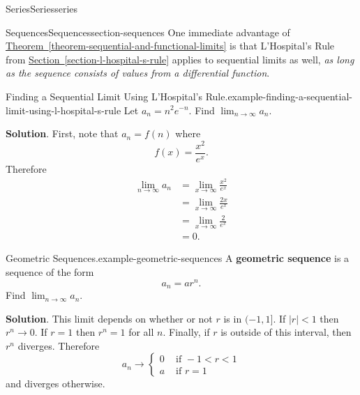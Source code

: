 \documentclass[oneside,10pt,]{book}
\newcommand{\terminology}[1]{\textbf{#1}}
\numberwithin{equation}{section}
\newcommand{\lt}{<}
\newcommand{\amp}{&}
\begin{document}
\begin{chapterptx}{Series}{}{Series}{}{}{series}
\begin{sectionptx}{Sequences}{}{Sequences}{}{}{section-sequences}
\hypertarget{p-797}{}%
One immediate advantage of \hyperref[theorem-sequential-and-functional-limits]{Theorem~\ref{theorem-sequential-and-functional-limits}} is that L'Hospital's Rule from \hyperref[section-l-hospital-s-rule]{Section~\ref{section-l-hospital-s-rule}} applies to sequential limits as well, \emph{as long as the sequence consists of values from a differential function}.%
\begin{example}{Finding a Sequential Limit Using L'Hospital's Rule.}{example-finding-a-sequential-limit-using-l-hospital-s-rule}%
\hypertarget{p-798}{}%
Let \(a_{n} = n^{2}e^{-n}\). Find \(\lim_{n\to\infty}a_{n}\).%
\par\smallskip%
\noindent\textbf{Solution}.\hypertarget{solution-164}{}\quad%
\hypertarget{p-799}{}%
First, note that \(a_{n} = f(n)\) where%
\begin{equation*}
f(x) = \frac{x^{2}}{e^{x}}\text{.}
\end{equation*}
Therefore%
%
\begin{align*}
\lim_{n\to\infty}a_{n} \amp = \lim_{x\to\infty}\frac{x^{2}}{e^{x}} \\
\amp = \lim_{x\to\infty}\frac{2x}{e^{x}} \\
\amp = \lim_{x\to\infty}\frac{2}{e^{x}} \\
\amp = 0 \text{.}
\end{align*}
\end{example}
\begin{example}{Geometric Sequences.}{example-geometric-sequences}%
\hypertarget{p-800}{}%
A \terminology{geometric sequence} is a sequence of the form%
\begin{equation*}
a_{n} = ar^{n}.
\end{equation*}
Find \(\lim_{n\to\infty}a_{n}\).%
\par\smallskip%
\noindent\textbf{Solution}.\hypertarget{solution-165}{}\quad%
\hypertarget{p-801}{}%
This limit depends on whether or not \(r\) is in \((-1,1]\). If \(|r| \lt 1\) then \(r^{n}\to 0\). If \(r = 1\) then \(r^{n} = 1\) for all \(n\). Finally, if \(r\) is outside of this interval, then \(r^{n}\) diverges. Therefore%
\begin{equation*}
a_{n} \to \begin{cases} 0 \amp \text{ if } -1 \lt r \lt 1 \\ a \amp \text{ if } r = 1 \end{cases}
\end{equation*}
and diverges otherwise.%
\end{example}
\hypertarget{p-802}{}%

\end{sectionptx}
\end{chapterptx}
\end{document}
